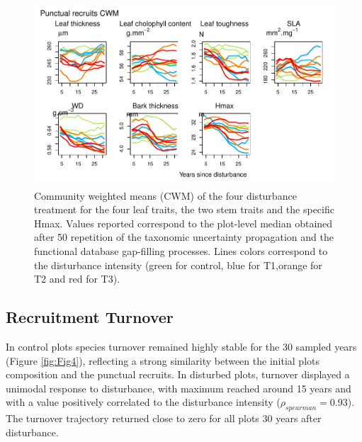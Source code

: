 \documentclass[fleqn,10pt]{ArtEcoFoG} %
\begin{document}
\begin{figure}

{\centering \includegraphics[width=0.8\linewidth]{RecruitmentTrajectories_files/figure-latex/Fig3-1} 

}

\caption{Community weighted means (CWM) of the four disturbance treatment for the four leaf traits, the two stem traits  and the specific Hmax. Values reported correspond to the plot-level median obtained after 50 repetition of the taxonomic uncertainty propagation and the functional database gap-filling processes. Lines colors correspond to the disturbance intensity (green for control, blue for T1,orange for T2 and red for T3).}\label{fig:Fig3}
\end{figure}

\subsection{Recruitment Turnover}\label{recruitment-turnover}

In control plots species turnover remained highly stable for the 30
sampled years (Figure \ref{fig:Fig4}), reflecting a strong similarity
between the initial plots composition and the punctual recruits. In
disturbed plots, turnover displayed a unimodal response to disturbance,
with maximum reached around 15 years and with a value positively
correlated to the disturbance intensity (\(\rho_{spearman}=0.93\)). The
turnover trajectory returned close to zero for all plots 30 years after
disturbance.
\end{document}
